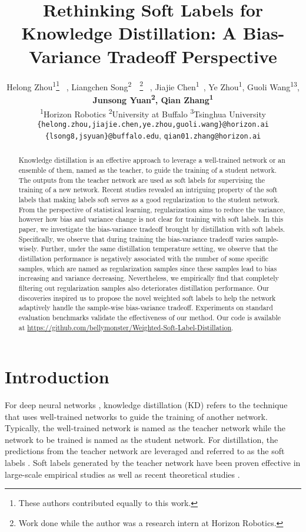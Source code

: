 \documentclass{article} \usepackage{iclr2021_conference,times}
\title{Rethinking Soft Labels for Knowledge Distillation: A Bias-Variance Tradeoff Perspective}
\author{
Helong Zhou\textsuperscript{\rm 1}\thanks{These authors contributed equally to this work.} ~, 
Liangchen Song\textsuperscript{\rm 2}\footnotemark[1]~~\thanks{Work done while the author was a research intern at Horizon Robotics.} ~,
Jiajie Chen\textsuperscript{\rm 1}\footnotemark[1] ~, 
Ye Zhou\textsuperscript{\rm 1}, 
Guoli Wang\textsuperscript{\rm 1}\textsuperscript{\rm 3}, \\
\textbf{
Junsong Yuan\textsuperscript{\rm 2},
Qian Zhang\textsuperscript{\rm 1}} \\
\textsuperscript{\rm 1}Horizon Robotics \quad
\textsuperscript{\rm 2}University at Buffalo \quad
\textsuperscript{\rm 3}Tsinghua University\\
\texttt{\{helong.zhou,jiajie.chen,ye.zhou,guoli.wang\}@horizon.ai}\\
\texttt{\{lsong8,jsyuan\}@buffalo.edu}, \texttt{qian01.zhang@horizon.ai}
}
\begin{document}
\maketitle

\begin{abstract}
Knowledge distillation is an effective approach to leverage a well-trained network or an ensemble of them, named as the teacher, to guide the training of a student network. The outputs from the teacher network are used as soft labels for supervising the training of a new network. Recent studies \citep{muller2019does,yuan2020revisiting} revealed an intriguing property of the soft labels that making labels soft serves as a good regularization to the student network. 
From the perspective of statistical learning, regularization aims to reduce the variance, however how bias and variance change is not clear for training with soft labels. 
In this paper, we investigate the bias-variance tradeoff brought by distillation with soft labels. 
Specifically, we observe that during training the bias-variance tradeoff varies sample-wisely. Further, under the same distillation temperature setting, we observe that the distillation performance is negatively associated with the number of some specific samples, which are named as regularization samples since these samples lead to bias increasing and variance decreasing. Nevertheless, we empirically find that completely filtering out regularization samples also deteriorates distillation performance. Our discoveries inspired us to propose the novel weighted soft labels to help the network adaptively handle the sample-wise bias-variance tradeoff. Experiments on standard evaluation benchmarks validate the effectiveness of our method. Our code is available at \url{https://github.com/bellymonster/Weighted-Soft-Label-Distillation}.
\end{abstract}


\section{Introduction}
For deep neural networks \citep{goodfellow2016deep}, knowledge distillation (KD) \citep{ba2014deep,Hinton2015DistillingTK} refers to the technique that uses well-trained networks to guide the training of another network. Typically, the well-trained network is named as the teacher network while the network to be trained is named as the student network. For distillation, the predictions from the teacher network are leveraged and referred to as the soft labels \citep{balan2015bayesian,muller2019does}. Soft labels generated by the teacher network have been proven effective in large-scale empirical studies \citep{liang2019knowledge,Tian2020Contrastive,ZagoruykoK17,RomeroBKCGB14} as well as recent theoretical studies \citep{phuong2019towards}.
\end{document}
